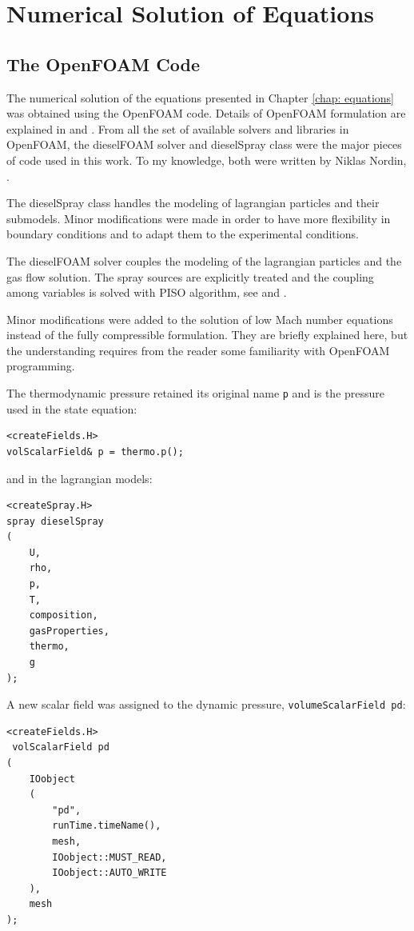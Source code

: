 \section{Numerical Solution of Equations}

\subsection{The OpenFOAM Code}

The numerical solution of the equations presented in Chapter \ref{chap: equations} was obtained using the OpenFOAM code. Details of OpenFOAM formulation are explained in \cite{jasak} and \cite{weller}.  From all the set of available solvers and libraries in OpenFOAM, the dieselFOAM solver and dieselSpray class were the major pieces of code used in this work. To my knowledge, both were written by Niklas Nordin, \cite{nordin}.

The dieselSpray class handles the modeling of lagrangian particles and their submodels. Minor modifications were made in order to have more flexibility in boundary conditions and to adapt them to the experimental conditions.

The dieselFOAM solver couples the modeling of the lagrangian particles and the gas flow solution. The spray sources are explicitly treated and the coupling among variables is solved with PISO algorithm, see \cite{jasak} and \cite{ferziger}.

Minor modifications were added to the solution of low Mach number equations instead of the fully compressible formulation.
They are briefly explained here, but the understanding requires from the reader some familiarity with OpenFOAM programming.

The thermodynamic pressure retained its original name \verb|p| and is the pressure used in the state equation:
\begin{verbatim}
<createFields.H>
volScalarField& p = thermo.p();                               
\end{verbatim} 
and in the lagrangian models:
\begin{verbatim}
<createSpray.H>
spray dieselSpray
(
    U,
    rho,
    p,
    T,
    composition,
    gasProperties,
    thermo,
    g
);\end{verbatim} 

A new scalar field was assigned to the dynamic pressure, \verb|volumeScalarField pd|:
\begin{verbatim}
<createFields.H>
 volScalarField pd
(
    IOobject
    (
        "pd",
        runTime.timeName(),
        mesh,
        IOobject::MUST_READ,
        IOobject::AUTO_WRITE
    ),
    mesh
);
\end{verbatim} 

